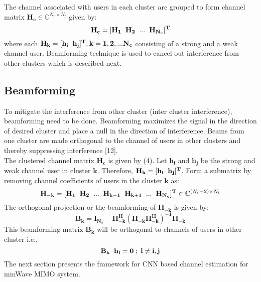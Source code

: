 \documentclass[journal]{IEEEtran}
\begin{document}
The channel associated with users in each cluster are grouped to form channel matrix $\mathbf{H_{c}} \in \mathbb{C}^{N_r \times N_t} $ given by:
\begin{equation}
\mathbf{H_{c} = [H_1 \hspace{.2cm}H_2 \hspace{.2cm} ... \hspace{.2cm}H_{N_c}]^T}
\end{equation}
where each $\mathbf{H_k = [h_i \hspace{.2cm} h_j]^T}; \mathbf{k= 1,2,...N_c}$ consisting of a strong and a weak channel user. Beamforming technique is used to cancel out interference from other clusters which is described next.

\subsection{Beamforming}
To mitigate the interference from other cluster (inter cluster interference), beamforming need to be done. Beamforming maximizes the signal in the direction of desired cluster and place a null in the direction of interference. Beams from one cluster are made orthogonal to the channel of users in other clusters and thereby suppressing interference [12]. \\
The clustered channel matrix $\mathbf{H_{c}}$ is given by (4). Let $\mathbf{h_i}$ and  $\mathbf{h_j}$ be the strong and weak channel user in cluster $\mathbf{k}$. Therefore, $\mathbf{H_k = [h_i \hspace{.2cm} h_j]^T}$.  Form a submatrix by removing channel coefficients of users in the cluster $\mathbf{k}$ as:
\begin{equation}
\mathbf{H_{-k} = [H_1 \hspace{0.2cm} H_2 \hspace{0.2cm} ...\hspace{0.2cm}H_{k-1} \hspace{0.2cm} H_{k+1} \hspace{0.2cm} . . . \hspace{0.2cm} H_{N_c}]^T} \in \mathbb{C}^{(N_r -2) \times N_t}
\end{equation}
The orthogonal projection or the beamforming of $\mathbf{H_{-k}}$ is given by:
\begin{equation}
\mathbf{B_k = I_{N_t} - H_{-k}^H (H_{-k}H_{-k}^H)^{-1}H_{-k}}
\end{equation}
This beamforming matrix $\mathbf{B_k}$ will be orthogonal to channels of users in other cluster i.e.,
\begin{equation}
\mathbf{B_k \hspace{0.2cm} h_l = 0 \; ;\; l \neq i,j}\\
\end{equation}
The next section presents the framework for CNN based channel estimation for mmWave MIMO system. \\
\end{document}

